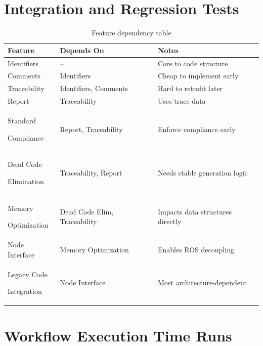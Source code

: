 \newpage

\section{Integration and Regression Tests}
\label{app:int_and_reg_tests}


\bgroup
{}
\begin{xltabular}{\textwidth}{X X X}
	\caption{Feature dependency table}
	\label{tab:app_int_and_reg_tests}\\
	\toprule
	Feature & Depends On & Notes \\
	\midrule
	Identifiers & – & Core to code structure \\
	Comments & Identifiers & Cheap to implement early \\
	Traceability & Identifiers, Comments & Hard to retrofit later \\
	Report & Traceability & Uses trace data \\
	Standard\par Compliance & Report, Traceability & Enforce compliance early \\
	Dead Code\par Elimination & Traceability, Report & Needs stable generation logic \\
	Memory\par Optimization & Dead Code Elim, Traceability & Impacts data structures directly \\
	Node Interface & Memory Optimization & Enables \gls{ROS} decoupling \\
	Legacy Code\par Integration & Node Interface & Most architecture-dependent \\
	\bottomrule
\end{xltabular}


\section{Workflow Execution Time Runs}
\label{app:workflow_exec_time}


